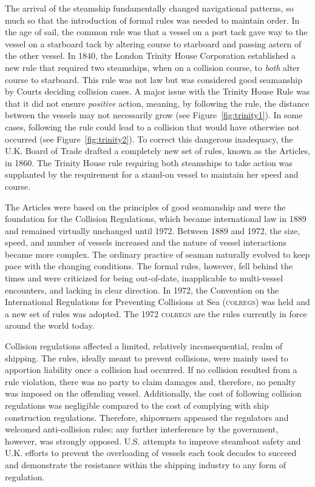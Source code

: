 \documentclass[twoside,symmetric,notoc]{tufte-book}
\begin{document}
\par{%
The arrival of the steamship fundamentally changed navigational patterns, so much so that the introduction of formal rules was needed to maintain order. In the age of sail, the common rule was that a vessel on a port tack gave way to the vessel on a starboard tack by altering course to starboard and passing astern of the other vessel.\cite{Plant} In 1840, the London Trinity House Corporation established a new rule that required two steamships, when on a collision course, to \textit{both} alter course to starboard. This rule was not law but was considered good seamanship by Courts deciding collision cases. A major issue with the Trinity House Rule was that it did not ensure \textit{positive} action, meaning, by following the rule, the distance between the vessels may not necessarily grow (see Figure~\ref{fig:trinity1}). In some cases, following the rule could lead to a collision that would have otherwise not occurred (see Figure~\ref{fig:trinity2}). To correct this dangerous inadequacy, the U.K. Board of Trade drafted a completely new set of rules, known as the Articles, in 1860. The Trinity House rule requiring both steamships to take action was supplanted by the requirement for a stand-on vessel to maintain her speed and course.\cite{Llana}
}
\par{%
The Articles were based on the principles of good seamanship and were the foundation for the Collision Regulations, which became international law in 1889 and remained virtually unchanged until 1972.\cite{Kemp}\cite{Mansell}  Between 1889 and 1972, the size, speed, and number of vessels increased and the nature of vessel interactions became more complex.\cite{revision} The ordinary practice of seaman naturally evolved to keep pace with the changing conditions. The formal rules, however, fell behind the times and were criticized for being out-of-date, inapplicable to multi-vessel encounters, and lacking in clear direction.\cite{Plant}\cite{Garcaa-Fraas} In 1972, the Convention on the International Regulations for Preventing Collisions at Sea (\textsc{colregs}) was held and a new set of rules was adopted. The 1972 \textsc{colregs} are the rules currently in force around the world today.
}
\par{%
Collision regulations affected a limited, relatively inconsequential, realm of shipping. The rules, ideally meant to prevent collisions, were mainly used to apportion liability once a collision had occurred. If no collision resulted from a rule violation, there was no party to claim damages and, therefore, no penalty was imposed on the offending vessel. Additionally, the cost of following collision regulations was negligible compared to the cost of complying with ship construction regulations. Therefore, shipowners appeased the regulators and welcomed anti-collision rules; any further interference by the government, however, was strongly opposed. U.S. attempts to improve steamboat safety and U.K. efforts to prevent the overloading of vessels each took decades to succeed and demonstrate the resistance within the shipping industry to any form of regulation.
}
\end{document}
